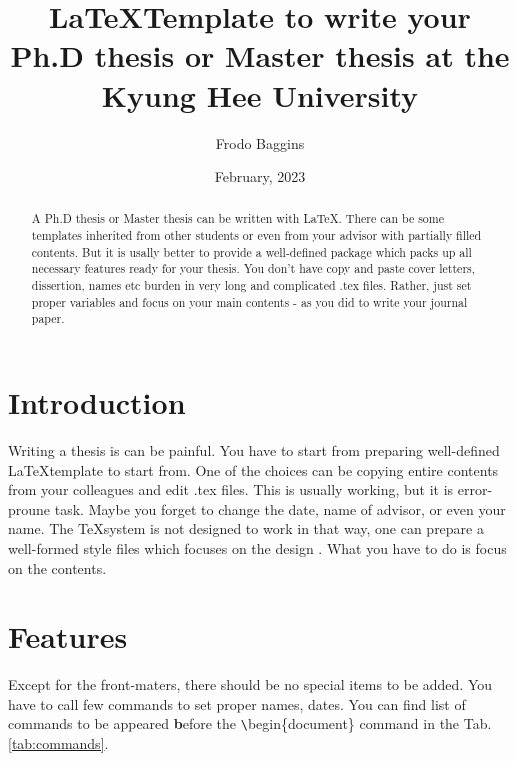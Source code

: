 \documentclass[11pt]{article}
\title{\LaTeX Template to write your Ph.D thesis or Master thesis at the Kyung Hee University}
\author{Frodo Baggins}
\date{February, 2023}
\begin{document}
\makefrontmatters %

\begin{abstract}%
A Ph.D thesis or Master thesis can be written with \LaTeX. There can be some templates inherited from other students or even from your advisor with partially filled contents. But it is usally better to provide a well-defined package which packs up all necessary features ready for your thesis. You don't have copy and paste cover letters, dissertion, names etc burden in very long and complicated .tex files. Rather, just set proper variables and focus on your main contents - as you did to write your journal paper.
\end{abstract}

\section{Introduction}
Writing a thesis is can be painful. You have to start from preparing well-defined \LaTeX template to start from. One of the choices can be copying entire contents from your colleagues and edit .tex files. This is usually working, but it is error-proune task. Maybe you forget to change the date, name of advisor, or even your name. The \TeX system is not designed to work in that way, one can prepare a well-formed style files which focuses on the design \cite{texbook,latex:companion,latex2e,knuth:1984,lesk:1977}. What you have to do is focus on the contents.

\section{Features}
Except for the front-maters, there should be no special items to be added. You have to call few commands to set proper names, dates. You can find list of commands to be appeared {\textbf before the {\texttt\textbackslash{}begin\{document\}}} command in the Tab. \ref{tab:commands}.
\end{document}
